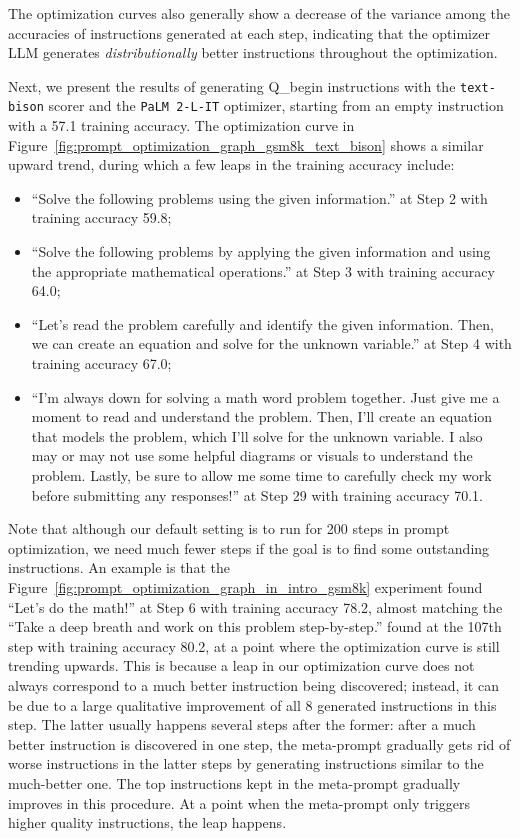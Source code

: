 The optimization curves also generally show a decrease of the variance among the accuracies of instructions generated at each step, indicating that the optimizer LLM generates \emph{distributionally} better instructions throughout the optimization.

Next, we present the results of generating Q\_begin instructions with the \texttt{text-bison} scorer and the \texttt{PaLM 2-L-IT} optimizer, starting from an empty instruction with a 57.1 training accuracy.
The optimization curve in Figure~\ref{fig:prompt_optimization_graph_gsm8k_text_bison} shows a similar upward trend, during which a few leaps in the training accuracy include:
\begin{itemize}[leftmargin=2em,topsep=0pt,partopsep=1ex,parsep=0ex]
\item ``Solve the following problems using the given information.'' at Step 2 with training accuracy 59.8;
\item ``Solve the following problems by applying the given information and using the appropriate mathematical operations.'' at Step 3 with training accuracy 64.0;
\item ``Let's read the problem carefully and identify the given information. Then, we can create an equation and solve for the unknown variable.'' at Step 4 with training accuracy 67.0;
\item ``I'm always down for solving a math word problem together. Just give me a moment to read and understand the problem. Then, I'll create an equation that models the problem, which I'll solve for the unknown variable. I also may or may not use some helpful diagrams or visuals to understand the problem. Lastly, be sure to allow me some time to carefully check my work before submitting any responses!'' at Step 29 with training accuracy 70.1.
\end{itemize}

Note that although our default setting is to run \name{} for 200 steps in prompt optimization, we need much fewer steps if the goal is to find some outstanding instructions.
An example is that the Figure~\ref{fig:prompt_optimization_graph_in_intro_gsm8k} experiment found ``Let's do the math!'' at Step 6 with training accuracy 78.2, almost matching the ``Take a deep breath and work on this problem step-by-step.'' found at the 107th step with training accuracy 80.2, at a point where the optimization curve is still trending upwards.
This is because a leap in our optimization curve does not always correspond to a much better instruction being discovered; instead, it can be due to a large qualitative improvement of all 8 generated instructions in this step.
The latter usually happens several steps after the former: after a much better instruction is discovered in one step, the meta-prompt gradually gets rid of worse instructions in the latter steps by generating instructions similar to the much-better one. 
The top instructions kept in the meta-prompt gradually improves in this procedure.
At a point when the meta-prompt only triggers higher quality instructions, the leap happens.

